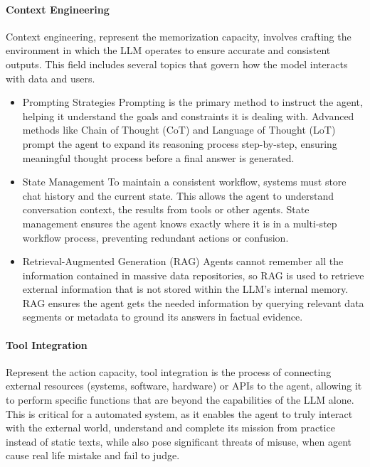 \paragraph*{Context Engineering}
Context engineering, represent the memorization capacity, involves crafting the environment in which the LLM operates to ensure 
accurate and consistent outputs. This field includes several topics that govern how the model interacts with data and users.
\begin{itemize} 

\item {Prompting Strategies}
Prompting is the primary method to instruct the agent, helping it understand the goals and constraints it is dealing with. 
Advanced methods like Chain of Thought (CoT) and Language of Thought (LoT) prompt the agent to expand its reasoning 
process step-by-step, ensuring meaningful thought process before a final answer is generated.

\item {State Management}
To maintain a consistent workflow, systems must store chat history and the current state. This allows the agent to understand 
conversation context, the results from tools or other agents. State management ensures 
the agent knows exactly where it is in a multi-step workflow process, preventing redundant actions or confusion.

\item {Retrieval-Augmented Generation (RAG)}
Agents cannot remember all the information contained in massive data repositories, so RAG is used to retrieve external 
information that is not stored within the LLM's internal memory. RAG ensures the agent gets the needed information by querying 
relevant data segments or metadata to ground its answers in factual evidence.
\end{itemize}
\paragraph*{Tool Integration}
Represent the action capacity, tool integration is the process of connecting external resources (systems, software, hardware) or APIs to the agent, allowing it to perform specific functions that 
are beyond the capabilities of the LLM alone. This is critical for a automated system, as it enables the agent to
truly interact with the external world, understand and complete its mission from practice instead of static texts, while also pose significant 
threats of misuse, when agent cause 
real life mistake and fail to judge. 

